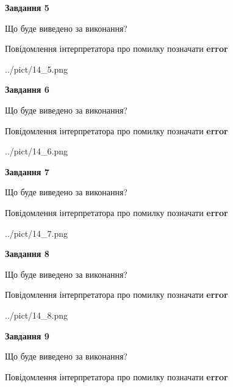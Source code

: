\documentclass[11pt, ukrainian]{article}
\begin{document}
{\begin {large}
{\begin {center}\textbf{Завдання 5}\end {center}}\par
Що буде виведено за виконання? \par
Повідомлення інтерпретатора про помилку позначати \textbf{error}

\begin{center}
	{../pict/14_5.png}
\end{center}
\newpage

{\begin {center}\textbf{Завдання 6}\end {center}}\par
Що буде виведено за виконання? \par
Повідомлення інтерпретатора про помилку позначати \textbf{error}

\begin{center}
	{../pict/14_6.png}
\end{center}
\newpage

{\begin {center}\textbf{Завдання 7}\end {center}}\par
Що буде виведено за виконання? \par
Повідомлення інтерпретатора про помилку позначати \textbf{error}

\begin{center}
	{../pict/14_7.png}
\end{center}
\newpage

{\begin {center}\textbf{Завдання 8}\end {center}}\par
Що буде виведено за виконання? \par
Повідомлення інтерпретатора про помилку позначати \textbf{error}

\begin{center}
	{../pict/14_8.png}
\end{center}
\newpage

{\begin {center}\textbf{Завдання 9}\end {center}}\par
Що буде виведено за виконання? \par
Повідомлення інтерпретатора про помилку позначати \textbf{error}


\end{large}}
\end{document}

